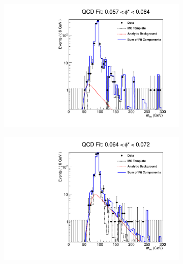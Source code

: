 \begin{figure}[!htbp]
    \centering
    \begin{subfigure}[b]{\SideBySidePlotWidth}
        \includegraphics[width=\linewidth]{figures/qcd_fits/qcd_fit_plot_for_13.pdf}
        \caption{}
        \label{fig:qcd_fit_13}
    \end{subfigure}%
    \begin{subfigure}[b]{\SideBySidePlotWidth}
        \includegraphics[width=\linewidth]{figures/qcd_fits/qcd_fit_plot_for_14.pdf}
        \caption{}
        \label{fig:qcd_fit_14}
    \end{subfigure}
    \begin{subfigure}[b]{\SideBySidePlotWidth}

\end{subfigure}
\end{figure}
